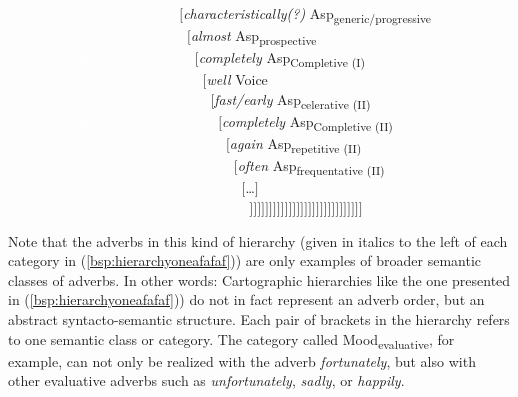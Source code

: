\begin{exe}
{\textcolor{white}{nnnnnnnnnnnnnnnnnnnnnn}$[$\textit{characteristically(?)} Asp\textsubscript{generic/progressive} \\
\textcolor{white}{nnnnnnnnnnnnnnnnnnnnnnn}$[$\textit{almost} Asp\textsubscript{prospective} \\
\textcolor{white}{nnnnnnnnnnnnnnnnnnnnnnnn}$[$\textit{completely} Asp\textsubscript{Completive (I)} \\
\textcolor{white}{nnnnnnnnnnnnnnnnnnnnnnnnn}$[$\textit{well} Voice \\
\textcolor{white}{nnnnnnnnnnnnnnnnnnnnnnnnnn}$[$\textit{fast/early} Asp\textsubscript{celerative (II)} \\
\textcolor{white}{nnnnnnnnnnnnnnnnnnnnnnnnnnn}$[$\textit{completely} Asp\textsubscript{Completive (II)} \\
\textcolor{white}{nnnnnnnnnnnnnnnnnnnnnnnnnnnn}$[$\textit{again} Asp\textsubscript{repetitive (II)} \\
\textcolor{white}{nnnnnnnnnnnnnnnnnnnnnnnnnnnnn}$[$\textit{often} Asp\textsubscript{frequentative (II)} \\
\textcolor{white}{nnnnnnnnnnnnnnnnnnnnnnnnnnnnnn}$[$\dots$]$ \\
\textcolor{white}{nnnnnnnnnnnnnnnnnnnnnnnnnnnnnnn}$]]]]]]]]]]]]]]]]]]]]]]]]]]]]]$ }
\end{exe}

\noindent Note that the adverbs in this kind of hierarchy (given in italics to the left of each category in (\ref{bsp:hierarchyoneafafaf})) are only examples of broader semantic classes of adverbs. In other words: Cartographic hierarchies like the one presented in (\ref{bsp:hierarchyoneafafaf})) do not in fact represent an adverb order, but an abstract syntacto-semantic structure. Each pair of brackets in the hierarchy refers to one semantic class or category. The category called Mood\textsubscript{evaluative}, for example, can not only be realized with the adverb \textit{fortunately}, but also with other evaluative adverbs such as \textit{unfortunately}, \textit{sadly}, or \textit{happily}.

